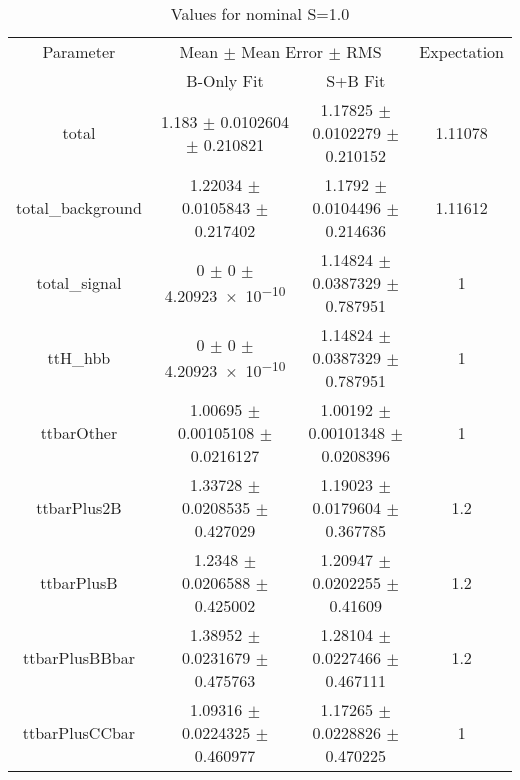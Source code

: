 \begin{table}
\centering
\caption{Values for nominal S=1.0}
\begin{tabular}{cccc}
\toprule
Parameter & \multicolumn{2}{c}{Mean $\pm$ Mean Error $\pm$ RMS} & Expectation\\
 & B-Only Fit & S+B Fit & \\
\midrule
total & \num{1.183} $\pm$ \num{0.0102604} $\pm$ \num{0.210821} & \num{1.17825} $\pm$ \num{0.0102279} $\pm$ \num{0.210152} & \num{1.11078}\\
total\_background & \num{1.22034} $\pm$ \num{0.0105843} $\pm$ \num{0.217402} & \num{1.1792} $\pm$ \num{0.0104496} $\pm$ \num{0.214636} & \num{1.11612}\\
total\_signal & \num{0} $\pm$ \num{0} $\pm$ \num{4.20923e-10} & \num{1.14824} $\pm$ \num{0.0387329} $\pm$ \num{0.787951} & \num{1}\\
ttH\_hbb & \num{0} $\pm$ \num{0} $\pm$ \num{4.20923e-10} & \num{1.14824} $\pm$ \num{0.0387329} $\pm$ \num{0.787951} & \num{1}\\
ttbarOther & \num{1.00695} $\pm$ \num{0.00105108} $\pm$ \num{0.0216127} & \num{1.00192} $\pm$ \num{0.00101348} $\pm$ \num{0.0208396} & \num{1}\\
ttbarPlus2B & \num{1.33728} $\pm$ \num{0.0208535} $\pm$ \num{0.427029} & \num{1.19023} $\pm$ \num{0.0179604} $\pm$ \num{0.367785} & \num{1.2}\\
ttbarPlusB & \num{1.2348} $\pm$ \num{0.0206588} $\pm$ \num{0.425002} & \num{1.20947} $\pm$ \num{0.0202255} $\pm$ \num{0.41609} & \num{1.2}\\
ttbarPlusBBbar & \num{1.38952} $\pm$ \num{0.0231679} $\pm$ \num{0.475763} & \num{1.28104} $\pm$ \num{0.0227466} $\pm$ \num{0.467111} & \num{1.2}\\
ttbarPlusCCbar & \num{1.09316} $\pm$ \num{0.0224325} $\pm$ \num{0.460977} & \num{1.17265} $\pm$ \num{0.0228826} $\pm$ \num{0.470225} & \num{1}\\
\bottomrule
\end{tabular}
\end{table}